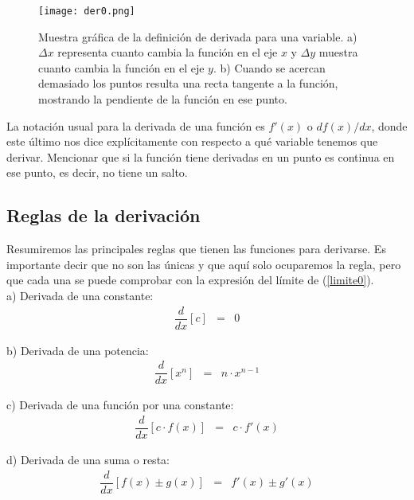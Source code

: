  \begin{center}
\begin{figure}[h!]
\centering
\texttt{[image: der0.png]}
\caption[Muestra gráfica de la definición de derivada para una variable.]{Muestra gráfica de la definición de derivada para una variable. a) $\Delta x$ representa cuanto cambia la función en el eje $x$ y $\Delta y$ muestra cuanto cambia la función en el eje $y$. b) Cuando se acercan demasiado los puntos resulta una recta tangente a la función, mostrando la pendiente de la función en ese punto.} \label{der0}
\end{figure}
\end{center}

La notación usual para la derivada de una función es $f'(x)$ o $df(x)/dx$, donde este último nos dice explícitamente con respecto a qué variable tenemos que derivar. Mencionar que si la función tiene derivadas en un punto es continua en ese punto,  es decir, no tiene un salto.

\subsection{Reglas de la derivación}
Resumiremos las principales reglas que tienen las funciones para derivarse. Es importante decir que no son las únicas y que aquí solo ocuparemos la regla, pero que cada una se puede comprobar con la expresión del límite de (\ref{limite0}).\\

\noindent a) Derivada de una constante:\\
\begin{eqnarray}
\dfrac{d}{dx}\left[c\right]&=&0
\end{eqnarray}

\noindent b) Derivada de una potencia:\\
\begin{eqnarray}
\dfrac{d}{dx}\left[x^{n}\right]&=&n\cdot x^{n-1}
\end{eqnarray}

\noindent c) Derivada de una función por una constante:\\
\begin{eqnarray}
\dfrac{d}{dx}\left[c\cdot f(x)\right]&=&c\cdot f'(x)
\end{eqnarray}

\noindent d) Derivada de una suma o resta:\\
\begin{eqnarray}
\dfrac{d}{dx}\left[f(x)\pm g(x)\right]&=& f'(x)\pm g'(x)
\end{eqnarray}

